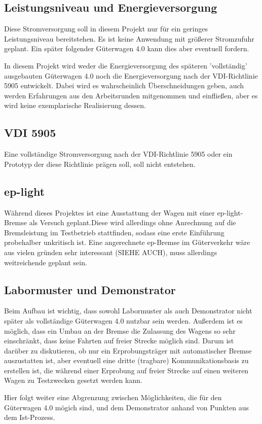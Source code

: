 \subsection{Leistungsniveau und Energieversorgung}
Diese Stromversorgung soll in diesem Projekt nur für ein geringes Leistungsniveau bereitstehen. Es ist keine Anwendung mit größerer Stromzufuhr geplant. Ein später folgender Güterwagen 4.0  kann dies aber eventuell fordern.\par
In diesem Projekt wird weder die Energieversorgung des späteren 'vollständig' ausgebauten Güterwagen 4.0 noch die Energieversorgung nach der VDI-Richtlinie 5905 entwickelt. Dabei wird es wahrscheinlich Überschneidungen geben, auch werden Erfahrungen aus den Arbeitsrunden mitgenommen und einfließen, aber es wird keine exemplarische Realisierung dessen.\par
\subsection{VDI 5905}
Eine vollständige Stromversorgung nach der VDI-Richtlinie 5905 oder ein Prototyp der diese Richtlinie prägen soll, soll nicht entstehen. 
\subsection{ep-light}
Während dieses Projektes ist eine Ausstattung der Wagen mit einer ep-light-Bremse als Versuch geplant.Diese wird allerdings ohne Anrechnung auf die Bremsleistung im Testbetrieb stattfinden, sodass eine erste Einführung probehalber unkritisch ist. Eine angerechnete ep-Bremse im Güterverkehr wäre aus vielen gründen sehr interessant (SIEHE AUCH), muss allerdings weitreichende geplant sein.\par
\subsection{Labormuster und Demonstrator}
Beim Aufbau ist wichtig, dass sowohl Labormuster als auch Demonstrator nicht später als vollständige Güterwagen 4.0 nutzbar sein werden. Außerdem ist es möglich, dass ein Umbau an der Bremse die Zulassung des Wagens so sehr einschränkt, dass keine Fahrten auf freier Strecke möglich sind. Darum ist darüber zu diskutieren, ob nur ein Erprobungsträger mit automatischer Bremse auszustatten ist, aber eventuell eine dritte (tragbare) Kommunikationsbasis zu erstellen ist, die während einer Erprobung auf freier Strecke auf einen weiteren Wagen zu Testzwecken gesetzt werden kann.\par
Hier folgt weiter eine Abgrenzung zwischen Möglichkeiten, die für den Güterwagen 4.0  mögich sind, und dem Demonstrator anhand von Punkten aus dem Ist-Prozess.

